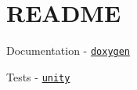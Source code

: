 \chapter{README }
\hypertarget{md_README}{}\label{md_README}

\begin{DoxyEnumerate}
\item Documentation -\/ \href{https://www.doxygen.nl/index.html}{\texttt{doxygen}}
\item Tests -\/ \href{https://www.throwtheswitch.org/unity}{\texttt{unity}} 
\end{DoxyEnumerate}